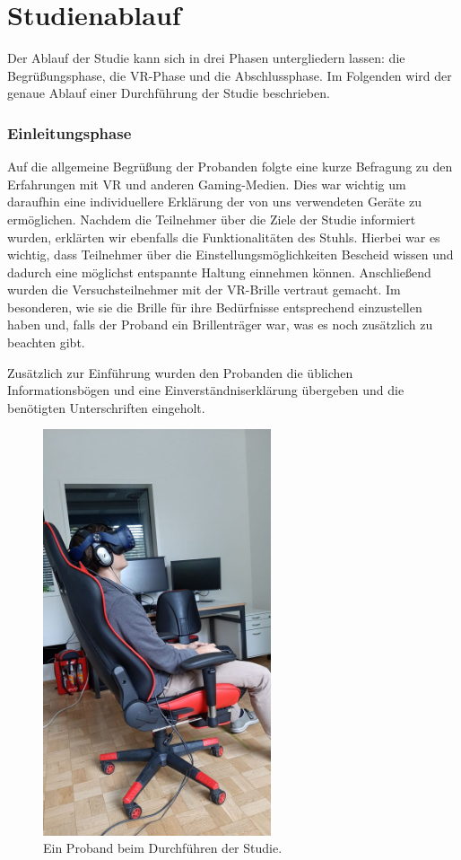 \section{Studienablauf}

Der Ablauf der Studie kann sich in drei Phasen untergliedern lassen: die Begrüßungsphase, die VR-Phase und die Abschlussphase. Im Folgenden wird der genaue Ablauf einer Durchführung der Studie beschrieben.

\subsubsection{Einleitungsphase}

Auf die allgemeine Begrüßung der Probanden folgte eine kurze Befragung zu den Erfahrungen mit VR und anderen Gaming-Medien. Dies war wichtig um daraufhin eine individuellere Erklärung der von uns verwendeten Geräte zu ermöglichen. 
Nachdem die Teilnehmer über die Ziele der Studie informiert wurden, erklärten wir ebenfalls die Funktionalitäten des Stuhls. Hierbei war es wichtig, dass Teilnehmer über die Einstellungsmöglichkeiten Bescheid wissen und dadurch eine möglichst entspannte Haltung einnehmen können. 
Anschließend wurden die Versuchsteilnehmer mit der VR-Brille vertraut gemacht. Im besonderen, wie sie die Brille für ihre Bedürfnisse entsprechend einzustellen haben und, falls der Proband ein Brillenträger war, was es noch zusätzlich zu beachten gibt.

Zusätzlich zur Einführung wurden den Probanden die üblichen Informationsbögen und eine Einverständniserklärung übergeben und die benötigten Unterschriften eingeholt. 

\begin{figure}[H]
	\centering
	\includegraphics[width=0.6\textwidth]{./images/studie_awf.jpeg}
	\caption{Ein Proband beim Durchführen der Studie.}
	\label{fig:study_setup}
\end{figure}

